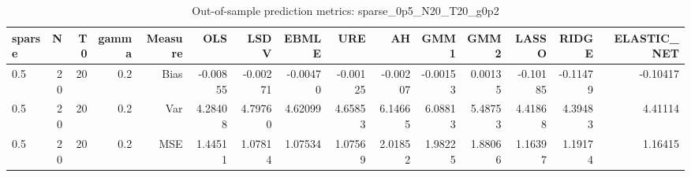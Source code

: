 \begin{table}[!htbp]\centering
\caption{Out-of-sample prediction metrics: sparse_0p5_N20_T20_g0p2}
\label{tab:table3_sparse_0p5_N20_T20_g0p2}
\begin{tabular}{lrrrrrrrrrrrrrr}
\hline
sparse & N & T0 & gamma & Measure & OLS & LSDV & EBMLE & URE & AH & GMM1 & GMM2 & LASSO & RIDGE & ELASTIC_NET \\
\hline
0.5 & 20 & 20 & 0.2 & Bias & -0.00855 & -0.00271 & -0.00470 & -0.00125 & -0.00207 & -0.00153 & 0.00135 & -0.10185 & -0.11479 & -0.10417 \\
0.5 & 20 & 20 & 0.2 & Var & 4.28408 & 4.79760 & 4.62099 & 4.65853 & 6.14665 & 6.08813 & 5.48753 & 4.41868 & 4.39483 & 4.41114 \\
0.5 & 20 & 20 & 0.2 & MSE & 1.44511 & 1.07814 & 1.07534 & 1.07569 & 2.01852 & 1.98225 & 1.88066 & 1.16397 & 1.19174 & 1.16415 \\
\hline
\end{tabular}
\end{table}

